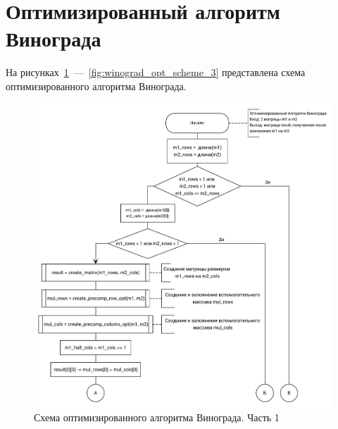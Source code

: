 \section{Оптимизированный алгоритм Винограда}

На рисунках~\ref{fig:winograd_opt_scheme_1}~---~\ref{fig:winograd_opt_scheme_3} представлена схема оптимизированного алгоритма Винограда.

\begin{figure}[H]
\centering
\includegraphics[width=\textwidth]{inc/img/winograd_opt_1.pdf}
\caption{Схема оптимизированного алгоритма Винограда. Часть 1}
\label{fig:winograd_opt_scheme_1}
\end{figure}


